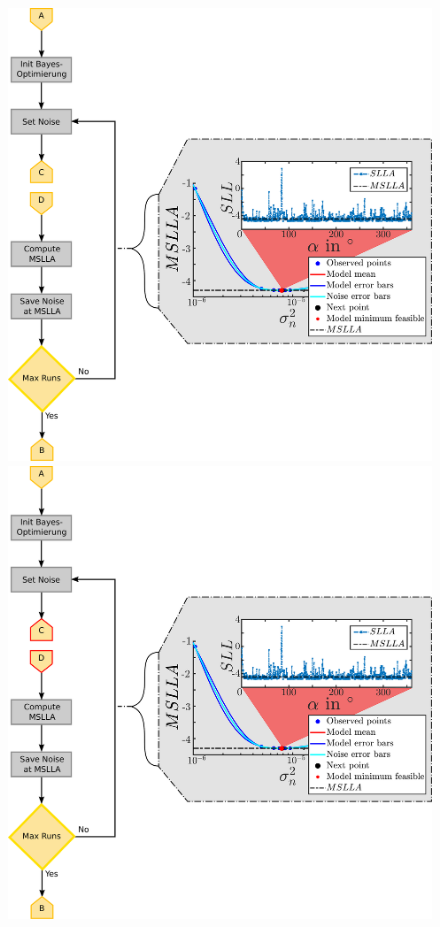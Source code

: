 \documentclass{beamer}
\begin{document}
\begin{frame}
\begin{columns}[c]
	\begin{figure}
		\begin{overprint}
			\includegraphics[width=\linewidth]{images/Noise_Optimization}
			\onslide<8>\includegraphics[width=\linewidth]{images/Noise_Optimization-1}
		\end{overprint}
	\end{figure}
\end{columns}
\end{frame}
\end{document}
